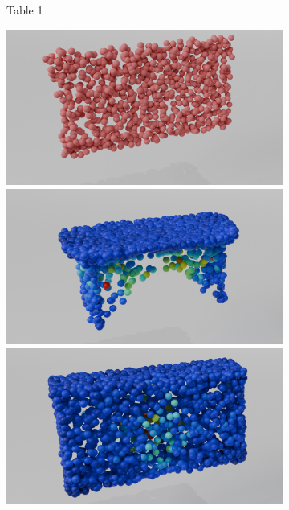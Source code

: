 \begin{figure}[htb]
\begin{subfigure}[t]{\textwidth+20pt\relax}
            \caption{Table 1}
          \end{subfigure}\hfill
          \begin{subfigure}[t]{0.315\textwidth}
            \includegraphics[width=\textwidth]{figures/part_t2.png}
            \includegraphics[width=\textwidth]{figures/dc_lin_t2.png}
            \includegraphics[width=\textwidth]{figures/do_lin_t2.png}

\end{subfigure}
\end{figure}
